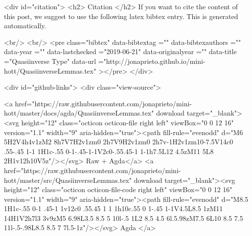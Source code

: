   
  <div id="citation">
  <h2> Citation </h2>
  If you want to cite the content of this post,
  we suggest to use the following latex bibtex entry.
  This is generated automatically.

  <br/>
  <br/>
  <pre class="bibtex"
       data-bibtextag =""
       data-bibtexauthors =""
       data-year =""
       data-lastchecked ="2019-06-21"
       data-originalyear =""
       data-title ="Quasiinverse Type"
       data-url ="http://jonaprieto.github.io/mini-hott/QuasiinverseLemmas.tex"
  ></pre>
  </div>
  

  <div id="github-links">
    <div class="view-source">
      
        <a href="https://raw.githubusercontent.com/jonaprieto/mini-hott/master/docs/agda/QuasiinverseLemmas.tex" download target="_blank"><svg height="12" class="octicon octicon-file right left" viewBox="0 0 12 16" version="1.1" width="9" aria-hidden="true"><path fill-rule="evenodd" d="M6 5H2V4h4v1zM2 8h7V7H2v1zm0 2h7V9H2v1zm0 2h7v-1H2v1zm10-7.5V14c0 .55-.45 1-1 1H1c-.55 0-1-.45-1-1V2c0-.55.45-1 1-1h7.5L12 4.5zM11 5L8 2H1v12h10V5z"/></svg> Raw + Agda</a>
        <a href="https://raw.githubusercontent.com/jonaprieto/mini-hott/master/src/QuasiinverseLemmas.tex" download target="_blank"><svg height="12" class="octicon octicon-file-code right left" viewBox="0 0 12 16" version="1.1" width="9" aria-hidden="true"><path fill-rule="evenodd" d="M8.5 1H1c-.55 0-1 .45-1 1v12c0 .55.45 1 1 1h10c.55 0 1-.45 1-1V4.5L8.5 1zM11 14H1V2h7l3 3v9zM5 6.98L3.5 8.5 5 10l-.5 1L2 8.5 4.5 6l.5.98zM7.5 6L10 8.5 7.5 11l-.5-.98L8.5 8.5 7 7l.5-1z"/></svg> Agda </a>
      
